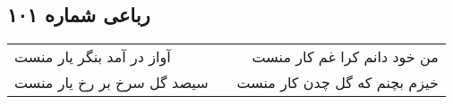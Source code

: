 \begin{center}
\section*{رباعی شماره ۱۰۱}
\label{sec:sh101}
\begin{longtable}{l p{0.5cm} r}
آواز در آمد بنگر یار منست
&&
من خود دانم کرا غم کار منست
\\
سیصد گل سرخ بر رخ یار منست
&&
خیزم بچنم که گل چدن کار منست
\\
\end{longtable}
\end{center}
